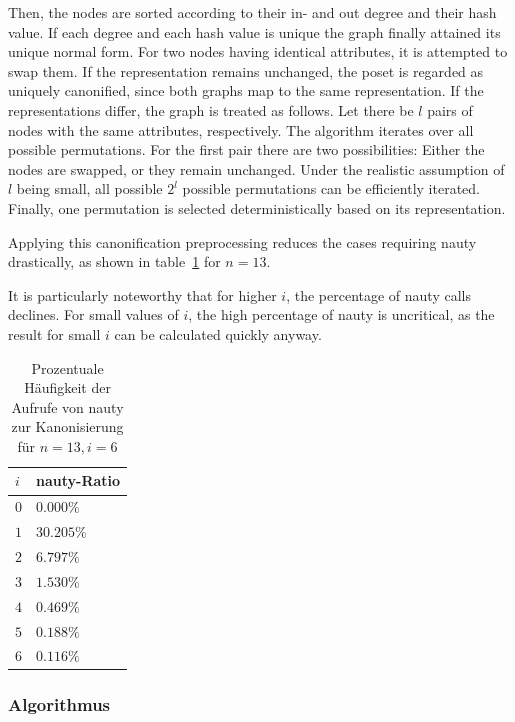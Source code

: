 \documentclass[10pt,journal,compsoc]{IEEEtran}
\begin{document}
Then, the nodes are sorted according to their in- and out degree and their hash value.
If each degree and each hash value is unique the graph finally attained its unique normal form.
For two nodes having identical attributes, it is attempted to swap them.
If the representation remains unchanged, the poset is regarded as uniquely canonified, since both graphs map to the same representation.
If the representations differ, the graph is treated as follows.
Let there be $l$ pairs of nodes with the same attributes, respectively.
The algorithm iterates over all possible permutations.
For the first pair there are two possibilities: Either the nodes are swapped, or they remain unchanged.
Under the realistic assumption of $l$ being small, all possible $2^l$ possible permutations can be efficiently iterated.
Finally, one permutation is selected deterministically based on its representation.

Applying this canonification preprocessing reduces the cases requiring nauty drastically, as shown in table~\ref{table:nauty-ratio} for $n=13$.

It is particularly noteworthy that for higher $i$, the percentage of nauty calls declines.
For small values of $i$, the high percentage of nauty is uncritical, as the result for small $i$ can be calculated quickly anyway.
\begin{table}
  \begin{tabular}{l|l}
    $i$ & nauty-Ratio \\
    \hline
    $0$ & $0.000\%$   \\
    $1$ & $30.205\%$  \\
    $2$ & $6.797\%$   \\
    $3$ & $1.530\%$   \\
    $4$ & $0.469\%$   \\
    $5$ & $0.188\%$   \\
    $6$ & $0.116\%$
  \end{tabular}
  \centering
  \caption{Prozentuale Häufigkeit der Aufrufe von nauty zur Kanonisierung für $n = 13, i = 6$}
  \label{table:nauty-ratio}
\end{table}

\subsubsection{Algorithmus} \label{sec:backward:algorithm}
\end{document}
